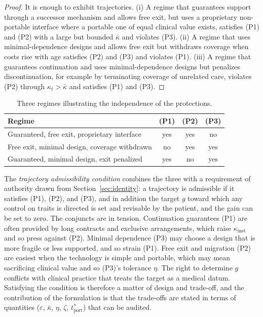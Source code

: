 \documentclass[11pt]{article}
\theoremstyle{plain}
\theoremstyle{definition}
\theoremstyle{remark}
\begin{document}
\begin{proof}
It is enough to exhibit trajectories. (i) A regime that guarantees support through a successor mechanism and allows free exit, but uses a proprietary non-portable interface where a portable one of equal clinical value exists, satisfies (P1) and (P2) with a large but bounded $\bar\kappa$ and violates (P3). (ii) A regime that uses minimal-dependence designs and allows free exit but withdraws coverage when costs rise with age satisfies (P2) and (P3) and violates (P1). (iii) A regime that guarantees continuation and uses minimal-dependence designs but penalizes discontinuation, for example by terminating coverage of unrelated care, violates (P2) through $\kappa_t>\bar\kappa$ and satisfies (P1) and (P3).
\end{proof}

\begin{table}[h]
\centering
\small
\begin{tabular}{p{4.6cm}ccc}
\toprule
Regime & (P1) & (P2) & (P3)\\
\midrule
Guaranteed, free exit, proprietary interface & yes & yes & no\\
Free exit, minimal design, coverage withdrawn & no & yes & yes\\
Guaranteed, minimal design, exit penalized & yes & no & yes\\
\bottomrule
\end{tabular}
\caption{Three regimes illustrating the independence of the protections.}
\label{tab:independence}
\end{table}

The \emph{trajectory admissibility condition} combines the three with a requirement of authority drawn from Section~\ref{sec:identity}: a trajectory is admissible if it satisfies (P1), (P2), and (P3), and in addition the target $g$ toward which any control on traits is directed is set and revisable by the patient, and the gain can be set to zero. The conjuncts are in tension. Continuation guarantees (P1) are often provided by long contracts and exclusive arrangements, which raise $\kappa_{\mathrm{inst}}$ and so press against (P2). Minimal dependence (P3) may choose a design that is more fragile or less supported, and so strain (P1). Free exit and migration (P2) are easiest when the technology is simple and portable, which may mean sacrificing clinical value and so (P3)'s tolerance $\eta$. The right to determine $g$ conflicts with clinical practice that treats the target as a medical datum. Satisfying the condition is therefore a matter of design and trade-off, and the contribution of the formulation is that the trade-offs are stated in terms of quantities ($\varepsilon$, $\bar\kappa$, $\eta$, $\zeta$, $t^\ast_{\mathrm{port}}$) that can be audited.
\end{document}

